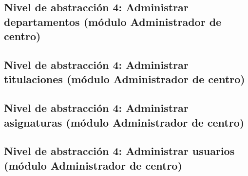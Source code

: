 \subsection{Nivel de abstracción 4: Administrar departamentos (módulo Administrador de centro)}



\subsection{Nivel de abstracción 4: Administrar titulaciones (\-mó\-dulo Administrador de centro)}



\subsection{Nivel de abstracción 4: Administrar asignaturas (\-mó\-dulo Administrador de centro)}



\subsection{Nivel de abstracción 4: Administrar usuarios (\-mó\-dulo Administrador de centro)}


